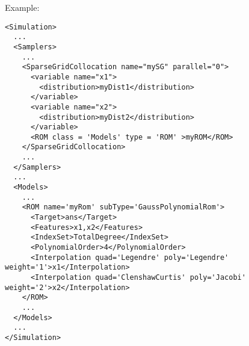 \hspace{24pt}
Example:
\begin{lstlisting}[style=XML,morekeywords={name,subType}]
<Simulation>
  ...
  <Samplers>
    ...
    <SparseGridCollocation name="mySG" parallel="0">
      <variable name="x1">
        <distribution>myDist1</distribution>
      </variable>
      <variable name="x2">
        <distribution>myDist2</distribution>
      </variable>
      <ROM class = 'Models' type = 'ROM' >myROM</ROM>
    </SparseGridCollocation>
    ...
  </Samplers>
  ...
  <Models>
    ...
    <ROM name='myRom' subType='GaussPolynomialRom'>
      <Target>ans</Target>
      <Features>x1,x2</Features>
      <IndexSet>TotalDegree</IndexSet>
      <PolynomialOrder>4</PolynomialOrder>
      <Interpolation quad='Legendre' poly='Legendre' weight='1'>x1</Interpolation>
      <Interpolation quad='ClenshawCurtis' poly='Jacobi' weight='2'>x2</Interpolation>
    </ROM>
    ...
  </Models>
  ...
</Simulation>
\end{lstlisting}


